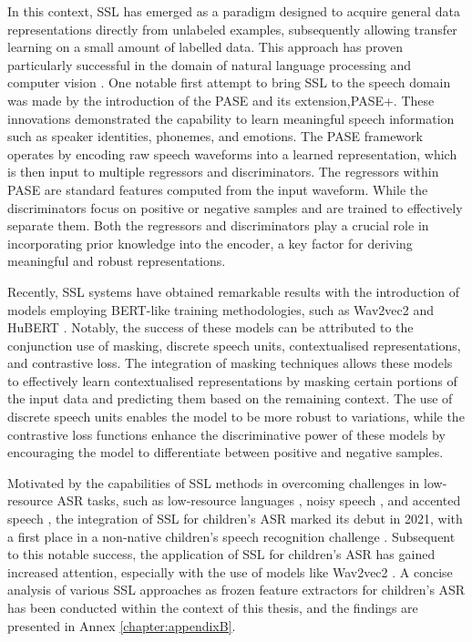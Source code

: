 In this context, \ac{SSL} has emerged as a paradigm designed to acquire general data representations directly from unlabeled examples, subsequently allowing transfer learning on a small amount of labelled data. This approach has proven particularly successful in the domain of natural language processing \cite{sarzynska2021detecting} and computer vision \cite{henaff2020data}.
One notable first attempt to bring \ac{SSL} to the speech domain was made by the introduction of the \ac{PASE} and its extension,\ac{PASE}+. These innovations demonstrated the capability to learn meaningful speech information such as speaker identities, phonemes, and emotions. The \ac{PASE} framework operates by encoding raw speech waveforms into a learned representation, which is then input to multiple regressors and discriminators. The regressors within \ac{PASE} are standard features computed from the input waveform. While the discriminators focus on positive or negative samples and are trained to effectively separate them. Both the regressors and discriminators play a crucial role in incorporating prior knowledge into the encoder, a key factor for deriving meaningful and robust representations. 

Recently, \ac{SSL} systems have obtained remarkable results with the introduction of models employing \ac{BERT}-like training methodologies, such as Wav2vec2 \cite{baevski2020wav2vec} and HuBERT \cite{hsu2021hubert}. Notably, the success of these models can be attributed to the conjunction use of masking, discrete speech units, contextualised representations, and contrastive loss. The integration of masking techniques allows these models to effectively learn contextualised representations by masking certain portions of the input data and predicting them based on the remaining context. The use of discrete speech units enables the model to be more robust to variations, while the contrastive loss functions enhance the discriminative power of these models by encouraging the model to differentiate between positive and negative samples.

Motivated by the capabilities of \ac{SSL} methods in overcoming challenges in low-resource \ac{ASR} tasks, such as low-resource languages \cite{riviere2020unsupervised}, noisy speech \cite{wang2022wav2vec}, and accented speech \cite{li2021accent}, the integration of \ac{SSL} for children's \ac{ASR} marked its debut in 2021, with a first place in a non-native children's speech recognition challenge \cite{xu2021tal}. Subsequent to this notable success, the application of \ac{SSL} for children's \ac{ASR} has gained increased attention, especially with the use of models like Wav2vec2 \cite{jain2023wav2vec2,jain2023adaptation,fan2022draft}. A concise analysis of various \ac{SSL} approaches as frozen feature extractors for children's \ac{ASR} has been conducted within the context of this thesis, and the findings are presented in Annex \ref{chapter:appendixB}.
   
